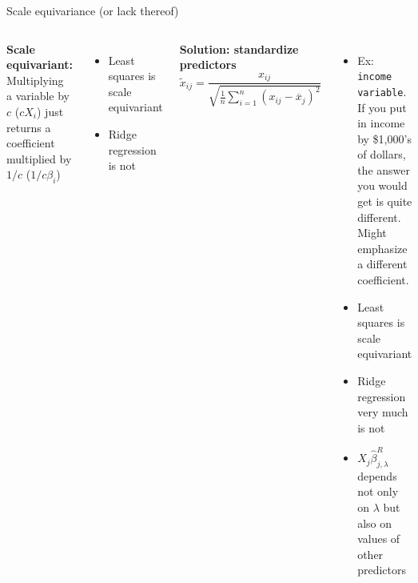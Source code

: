\documentclass[aspectratio=169,usenames,dvipsnames]{beamer}
\newcommand{\InstructorList}[1]{
\begin{itemize}
	\color{orange}
	#1
\end{itemize}
}
\begin{document}
\begin{frame}[t]{Scale equivariance (or lack thereof)}

\begin{columns}
\centering
\textbf{Scale equivariant:} Multiplying a variable by $c$ ($cX_i$) just returns a coefficient multiplied by $1/c$ ($1/c \beta_i$)

\vspace{1in}
\begin{itemize}
	\item Least squares is scale equivariant 
	\item Ridge regression is not
\end{itemize}

\textbf{Solution: standardize predictors}
\begin{equation*}
	\widetilde x_{ij} = \frac{x_{ij}}{
	\sqrt{ \tfrac{1}{n} \sum_{i=1}^n (x_{ij}-\overline x_j)^2}
	}
\end{equation*}
\centering
\InstructorList{
\item Ex: \texttt{income variable}. If you put in income by \$1,000's of dollars, the answer you would get is quite different. Might emphasize a different coefficient. 
\item Least squares is scale equivariant
\item Ridge regression very much is not
\item $X_j\hat \beta_{j,\lambda}^R$ depends not only on $\lambda$ but also on values of other predictors
}
\end{columns}

\end{frame}



\end{document}
